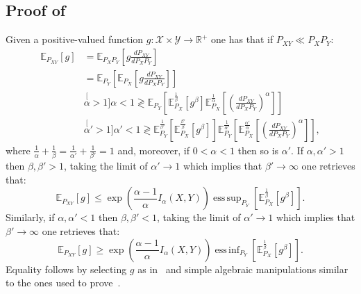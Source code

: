 \documentclass{article}
\numberwithin{theorem}{section}
\numberwithin{example}{section}
\numberwithin{remark}{section}
\numberwithin{definition}{section}
\DeclareMathOperator*{\esssup}{ess\,sup}
\DeclareMathOperator*{\essinf}{ess\,inf}
\newcommand{\X}{\mathcal{X}}
\newcommand{\Y}{\mathcal{Y}}
\begin{document}
\subsection{Proof of~}\label{app:proofVarReprSibs}
Given a positive-valued function $g:\X\times \Y \to \mathbb{R}^+$ one has that if $P_{XY}\ll P_XP_Y$:
\begin{align} \mathbb{E}_{P_{XY}}\left[g\right] &= \mathbb{E}_{P_XP_Y}\left[g\frac{dP_{XY}}{dP_XP_Y}\right] \\ 
&= \mathbb{E}_{P_Y}\left[\mathbb{E}_{P_X}\left[g\frac{dP_{XY}}{dP_XP_Y}\right]\right]\\ & \stackrel[\alpha>1]{\alpha<1}{\gtrless} \mathbb{E}_{P_Y}\left[\mathbb{E}^\frac1\beta_{P_X}\left[g^{\beta}\right]\mathbb{E}^\frac1\alpha_{P_X}\left[\left(\frac{dP_{XY}}{dP_XP_Y}\right)^\alpha\right]\right]\label{eq:holderVarReprSibsMI1} \\
&\stackrel[\alpha'>1]{\alpha'<1}{\gtrless} \mathbb{E}_{P_Y}^\frac{1}{\beta'}\left[\mathbb{E}^\frac{\beta'}{\beta}_{P_X}\left[g^{\beta}\right]\right]\mathbb{E}^\frac{1}{\alpha'}_{P_Y}\left[\mathbb{E}^\frac{\alpha'}\alpha_{P_X}\left[\left(\frac{dP_{XY}}{dP_XP_Y}\right)^\alpha\right]\right]\label{eq:holderVarReprSibsMI2},
\end{align}
where $\frac1\alpha+\frac1\beta =\frac{1}{\alpha'}+\frac{1}{\beta'} = 1$ and, moreover, if $0<\alpha<1$ then so is $\alpha'$. If $\alpha,\alpha'>1$ then $\beta,\beta'>1$, taking the limit of $\alpha'\to 1$ which implies that $\beta'\to\infty$ one retrieves that:
\begin{equation}
    \mathbb{E}_{P_{XY}}[g] \leq \exp\left(\frac{\alpha-1}{\alpha}I_\alpha(X,Y)\right) \esssup_{P_Y}\left[\mathbb{E}_{P_X}^\frac1\beta\left[g^\beta\right]\right].
\end{equation}
Similarly, if $\alpha,\alpha'<1$ then $\beta,\beta'<1$, taking the limit of $\alpha'\to 1$ which implies that $\beta'\to\infty$ one retrieves that:
\begin{equation}
    \mathbb{E}_{P_{XY}}[g] \geq \exp\left(\frac{\alpha-1}{\alpha}I_\alpha(X,Y)\right) \essinf_{P_Y}\left[\mathbb{E}_{P_X}^\frac1\beta\left[g^\beta\right]\right].
\end{equation}
Equality follows by selecting $g$ as in~ and simple algebraic manipulations similar to the ones used to prove~.
\end{document}

